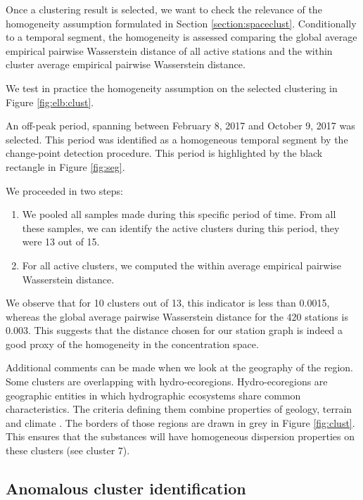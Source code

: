 Once a clustering result is selected, we want to check the relevance of the homogeneity assumption formulated in Section \ref{section:spaceclust}. Conditionally to a temporal segment, the homogeneity is assessed comparing the global average empirical pairwise Wasserstein distance of all active stations and the within cluster average empirical pairwise Wasserstein distance.    

We test in practice the homogeneity assumption on the selected clustering in Figure \ref{fig:elb:clust}. 

An off-peak period, spanning between February 8, 2017 and October 9, 2017 was selected. This period was identified as a homogeneous temporal segment by the change-point detection procedure.  This period is highlighted by the black rectangle in Figure \ref{fig:seg}.

We proceeded in two steps:
\begin{enumerate}
\item We pooled all samples made during this specific period of time. From all these samples, we can identify the active clusters during this period, they were 13 out of 15. 
\item For all active clusters, we computed the within average empirical pairwise Wasserstein distance. 
\end{enumerate}

We observe that for 10 clusters out of 13, this indicator is less than 0.0015, whereas the global average pairwise Wasserstein distance for the 420 stations is 0.003. This suggests that the distance chosen for our station graph is indeed a good proxy of the homogeneity in the concentration space. 

Additional comments can be made when we look at the geography of the region. Some clusters are overlapping with hydro-ecoregions. Hydro-ecoregions are geographic entities in which hydrographic ecosystems share common characteristics. The criteria defining them combine properties of geology, terrain and climate \cite{wasson:hal-02580774}. The borders of those regions are drawn in grey in Figure \ref{fig:clust}. This ensures that the substances will have homogeneous dispersion properties on these clusters (see cluster 7).

\subsection{Anomalous cluster identification}\label{subsection:anomalous}


